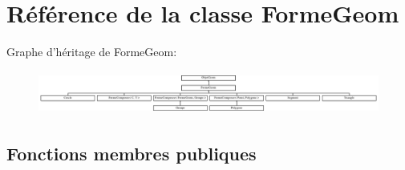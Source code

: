 \hypertarget{class_forme_geom}{\section{Référence de la classe Forme\+Geom}
\label{class_forme_geom}
}
Graphe d'héritage de Forme\+Geom\+:\begin{figure}[H]
\begin{center}
\leavevmode
\includegraphics[height=1.447028cm]{class_forme_geom}
\end{center}
\end{figure}
\subsection*{Fonctions membres publiques}
